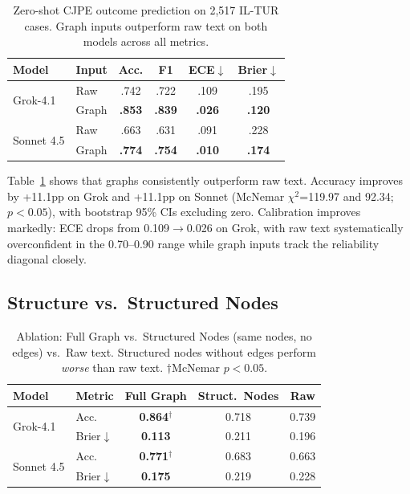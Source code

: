 \documentclass[11pt]{article}
\begin{document}
\begin{table}[t]
\small
\centering
\caption{Zero-shot CJPE outcome prediction on 2,517 IL-TUR cases. Graph inputs outperform raw text on both models across all metrics.}
\label{tab:main_results}
\begin{tabular}{llcccc}
\toprule
Model & Input & Acc. & F1 & ECE$\downarrow$ & Brier$\downarrow$ \\
\midrule
\multirow{2}{*}{Grok-4.1} & Raw & .742 & .722 & .109 & .195 \\
 & Graph & \textbf{.853} & \textbf{.839} & \textbf{.026} & \textbf{.120} \\
\midrule
\multirow{2}{*}{Sonnet 4.5} & Raw & .663 & .631 & .091 & .228 \\
 & Graph & \textbf{.774} & \textbf{.754} & \textbf{.010} & \textbf{.174} \\
\bottomrule
\end{tabular}
\end{table}

Table~\ref{tab:main_results} shows that graphs consistently outperform raw text. Accuracy improves by +11.1pp on Grok and +11.1pp on Sonnet (McNemar $\chi^2$=119.97 and 92.34; $p < 0.05$), with bootstrap 95\% CIs excluding zero. Calibration improves markedly: ECE drops from 0.109$\rightarrow$0.026 on Grok, with raw text systematically overconfident in the 0.70--0.90 range while graph inputs track the reliability diagonal closely.

\subsection{Structure vs.\ Structured Nodes}

\begin{table}[t]
\small
\centering
\caption{Ablation: Full Graph vs.\ Structured Nodes (same nodes, no edges) vs.\ Raw text. Structured nodes without edges perform \emph{worse} than raw text. $\dagger$McNemar $p < 0.05$.}
\label{tab:ablation}
\begin{tabular}{llccc}
\toprule
Model & Metric & Full Graph & Struct.\ Nodes & Raw \\
\midrule
\multirow{2}{*}{Grok-4.1} & Acc. & \textbf{0.864}$^\dagger$ & 0.718 & 0.739 \\
 & Brier$\downarrow$ & \textbf{0.113} & 0.211 & 0.196 \\
\midrule
\multirow{2}{*}{Sonnet 4.5} & Acc. & \textbf{0.771}$^\dagger$ & 0.683 & 0.663 \\
 & Brier$\downarrow$ & \textbf{0.175} & 0.219 & 0.228 \\
\bottomrule
\end{tabular}
\end{table}
\end{document}
